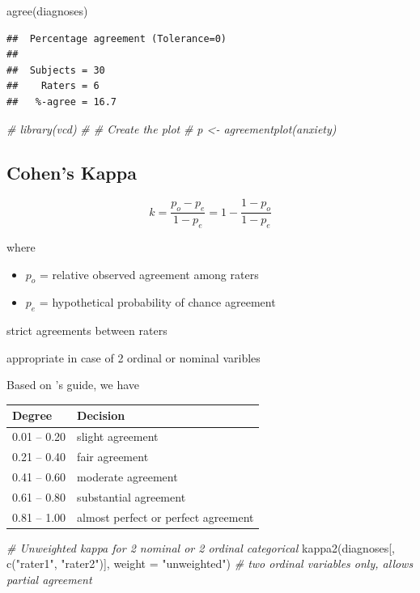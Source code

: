 \documentclass[
]{book}
\newenvironment{Shaded}{\begin{snugshade}}{\end{snugshade}}
\newcommand{\AttributeTok}[1]{\textcolor[rgb]{0.77,0.63,0.00}{#1}}
\newcommand{\CommentTok}[1]{\textcolor[rgb]{0.56,0.35,0.01}{\textit{#1}}}
\newcommand{\FunctionTok}[1]{\textcolor[rgb]{0.00,0.00,0.00}{#1}}
\newcommand{\NormalTok}[1]{#1}
\newcommand{\StringTok}[1]{\textcolor[rgb]{0.31,0.60,0.02}{#1}}
\begin{document}
\begin{Shaded}
\begin{Highlighting}[]
\FunctionTok{agree}\NormalTok{(diagnoses)}
\end{Highlighting}
\end{Shaded}

\begin{verbatim}
##  Percentage agreement (Tolerance=0)
## 
##  Subjects = 30 
##    Raters = 6 
##   %-agree = 16.7
\end{verbatim}

\begin{Shaded}
\begin{Highlighting}[]
\CommentTok{\# library(vcd)}
\CommentTok{\# \# Create the plot}
\CommentTok{\# p \textless{}{-} agreementplot(anxiety)}
\end{Highlighting}
\end{Shaded}

\hypertarget{cohens-kappa}{%
\subsection{Cohen's Kappa}\label{cohens-kappa}}

\citep{Cohen_1960}

\[
k = \frac{p_o - p_e}{1 - p_e} = 1 - \frac{1 - p_o}{1- p_e}
\]

where

\begin{itemize}
\item
  \(p_o\) = relative observed agreement among raters
\item
  \(p_e\) = hypothetical probability of chance agreement
\end{itemize}

strict agreements between raters

appropriate in case of 2 ordinal or nominal varibles

Based on \citep{Landis_1977}'s guide, we have

\begin{longtable}[]{@{}ll@{}}
\toprule
Degree & Decision\tabularnewline
\midrule
\endhead
0.01 -- 0.20 & slight agreement\tabularnewline
0.21 -- 0.40 & fair agreement\tabularnewline
0.41 -- 0.60 & moderate agreement\tabularnewline
0.61 -- 0.80 & substantial agreement\tabularnewline
0.81 -- 1.00 & almost perfect or perfect agreement\tabularnewline
\bottomrule
\end{longtable}

\begin{Shaded}
\begin{Highlighting}[]
\CommentTok{\# Unweighted kappa for 2 nominal or 2 ordinal categorical}
\FunctionTok{kappa2}\NormalTok{(diagnoses[, }\FunctionTok{c}\NormalTok{(}\StringTok{"rater1"}\NormalTok{, }\StringTok{"rater2"}\NormalTok{)], }\AttributeTok{weight =} \StringTok{"unweighted"}\NormalTok{) }\CommentTok{\# two ordinal variables only, allows partial agreement}
\end{Highlighting}
\end{Shaded}
\end{document}
